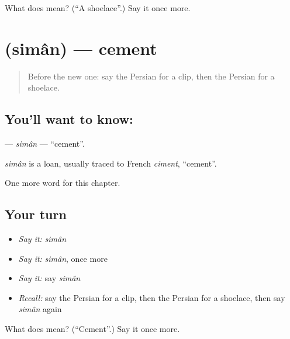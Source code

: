 \begin{tcolorbox}[breakable,colback=teal!4,colframe=teal!35!black,title={Before you move on}]
What does   mean? (\textquotedblleft{}A shoelace\textquotedblright{}.) Say it once more.
\end{tcolorbox}
\section[\texorpdfstring{\fa{سیمان} (simân)}{سیمان (simân)}]{ (simân) — cement}

\label{lesson:FA-C248-siman}



\begin{quote}
Before the new one: say the Persian for a clip, then the Persian for a shoelace.
\end{quote}

\subsection*{You'll want to know: }
\textbf{} — \emph{simân} — \textquotedblleft{}cement\textquotedblright{}.

\begin{cousinweb}
\emph{simân} is a loan, usually traced to French \emph{ciment}, \textquotedblleft{}cement\textquotedblright{}.
\end{cousinweb}

\begin{grammarlens}[title={What you've built}]
One more word for this chapter.
\end{grammarlens}

\subsection*{Your turn}
\begin{itemize}
\raggedright
  \item \emph{Say it:} \emph{simân}
  \item \emph{Say it:} \emph{simân}, once more
  \item \emph{Say it:} say \emph{simân}
  \item \emph{Recall:} say the Persian for a clip, then the Persian for a shoelace, then say \emph{simân} again
\end{itemize}

\begin{tcolorbox}[breakable,colback=teal!4,colframe=teal!35!black,title={Before you move on}]
What does  mean? (\textquotedblleft{}Cement\textquotedblright{}.) Say it once more.
\end{tcolorbox}
